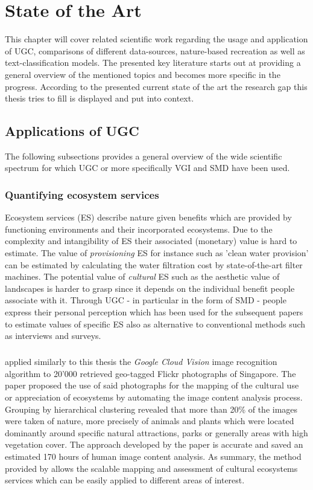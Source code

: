 \chapter{State of the Art} \label{state_of_the_art}
This chapter will cover related scientific work regarding the usage and application of UGC, comparisons of different data-sources, nature-based recreation as well as text-classification models. The presented key literature starts out at providing a general overview of the mentioned topics and becomes more specific in the progress. According to the presented current state of the art the research gap this thesis tries to fill is displayed and put into context.

\section{Applications of UGC} \label{applications_UGC}
The following subsections provides a general overview of the wide scientific spectrum for which UGC or more specifically VGI and SMD have been used.

\subsection{Quantifying ecosystem services}
Ecosystem services (ES) describe nature given benefits which are provided by functioning environments and their incorporated ecosystems. Due to the complexity and intangibility of ES their associated (monetary) value is hard to estimate. The value of \textit{provisioning} ES for instance such as 'clean water provision' can be estimated by calculating the water filtration cost by state-of-the-art filter machines. The potential value of \textit{cultural} ES such as the aesthetic value of landscapes is harder to grasp since it depends on the individual benefit people associate with it. Through UGC - in particular in the form of SMD - people express their personal perception which has been used for the subsequent papers to estimate values of specific ES also as alternative to conventional methods such as interviews and surveys.  
\paragraph*{\textcite{Richards2018}} applied similarly to this thesis the \textit{Google Cloud Vision} image recognition algorithm to 20'000 retrieved geo-tagged Flickr photographs of Singapore. The paper proposed the use of said photographs for the mapping of the cultural use or appreciation of ecosystems by automating the image content analysis process. Grouping by hierarchical clustering revealed that more than 20\% of the images were taken of nature, more precisely of animals and plants which were located dominantly around specific natural attractions, parks or generally areas with high vegetation cover. The approach developed by the paper is accurate and saved an estimated 170 hours of human image content analysis. As summary, the method provided by \textcite{Richards2018} allows the scalable mapping and assessment of cultural ecosystems services which can be easily applied to different areas of interest.

